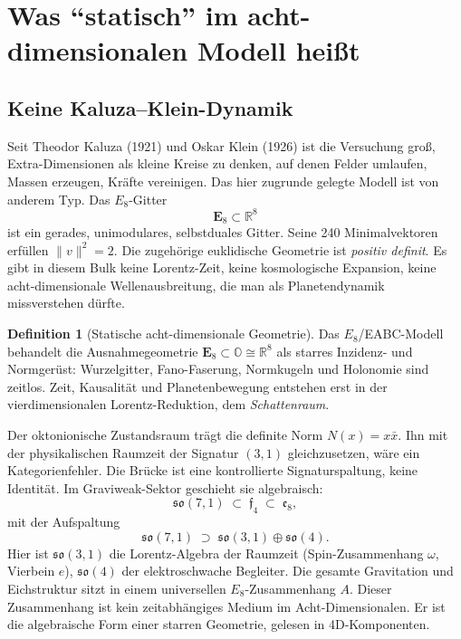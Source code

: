 \documentclass[11pt,a4paper]{article}
\theoremstyle{definition}
\newtheorem{definition}{Definition}[section]
\theoremstyle{remark}
\newcommand{\so}{\mathfrak{so}}
\begin{document}
\section{Was \texorpdfstring{\enquote{statisch}}{statisch} im acht-dimensionalen Modell heißt}

\subsection{Keine Kaluza--Klein-Dynamik}

Seit Theodor Kaluza (1921) und Oskar Klein (1926) ist die Versuchung groß, Extra-Dimensionen als kleine Kreise zu denken, auf denen Felder umlaufen, Massen erzeugen, Kräfte vereinigen. Das hier zugrunde gelegte Modell ist von anderem Typ. Das \(E_8\)-Gitter
\begin{equation}
\mathbf{E}_8\subset\mathbb{R}^8
\end{equation}
ist ein gerades, unimodulares, selbstduales Gitter. Seine 240 Minimalvektoren erfüllen \(\|v\|^2=2\). Die zugehörige euklidische Geometrie ist \emph{positiv definit}. Es gibt in diesem Bulk keine Lorentz-Zeit, keine kosmologische Expansion, keine acht-dimensionale Wellenausbreitung, die man als Planetendynamik missverstehen dürfte.

\begin{definition}[Statische acht-dimensionale Geometrie]
Das \(E_8\)/EABC-Modell behandelt die Ausnahmegeometrie \(\mathbf{E}_8\subset\mathbb{O}\cong\mathbb{R}^8\) als starres Inzidenz- und Normgerüst: Wurzelgitter, Fano-Faserung, Normkugeln und Holonomie sind zeitlos. Zeit, Kausalität und Planetenbewegung entstehen erst in der vierdimensionalen Lorentz-Reduktion, dem \emph{Schattenraum}.
\end{definition}

Der oktonionische Zustandsraum trägt die definite Norm \(N(x)=x\bar x\). Ihn mit der physikalischen Raumzeit der Signatur \((3,1)\) gleichzusetzen, wäre ein Kategorienfehler. Die Brücke ist eine kontrollierte Signaturspaltung, keine Identität. Im Graviweak-Sektor geschieht sie algebraisch:
\begin{equation}
\label{eq:kette}
\so(7,1)\;\subset\;\mathfrak{f}_4\;\subset\;\mathfrak{e}_8,
\end{equation}
mit der Aufspaltung
\begin{equation}
\so(7,1)\;\supset\;\so(3,1)\oplus\so(4).
\end{equation}
Hier ist \(\so(3,1)\) die Lorentz-Algebra der Raumzeit (Spin-Zusammenhang \(\omega\), Vierbein \(e\)), \(\so(4)\) der elektroschwache Begleiter. Die gesamte Gravitation und Eichstruktur sitzt in einem universellen \(E_8\)-Zusammenhang \(A\). Dieser Zusammenhang ist kein zeitabhängiges Medium im Acht-Dimensionalen. Er ist die algebraische Form einer starren Geometrie, gelesen in 4D-Komponenten.
\end{document}

